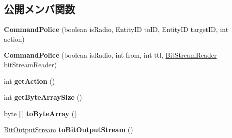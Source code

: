 \subsection*{公開メンバ関数}
\begin{DoxyCompactItemize}
\item 
\hypertarget{classadf_1_1agent_1_1communication_1_1standard_1_1bundle_1_1centralized_1_1CommandPolice_ac747822b23d13b000beb3b87899123a1}{}\label{classadf_1_1agent_1_1communication_1_1standard_1_1bundle_1_1centralized_1_1CommandPolice_ac747822b23d13b000beb3b87899123a1} 
{\bfseries Command\+Police} (boolean is\+Radio, Entity\+ID to\+ID, Entity\+ID target\+ID, int action)
\item 
\hypertarget{classadf_1_1agent_1_1communication_1_1standard_1_1bundle_1_1centralized_1_1CommandPolice_ae700d27dad6fa5ee05fa26f99b61e26e}{}\label{classadf_1_1agent_1_1communication_1_1standard_1_1bundle_1_1centralized_1_1CommandPolice_ae700d27dad6fa5ee05fa26f99b61e26e} 
{\bfseries Command\+Police} (boolean is\+Radio, int from, int ttl, \hyperlink{classadf_1_1component_1_1communication_1_1util_1_1BitStreamReader}{Bit\+Stream\+Reader} bit\+Stream\+Reader)
\item 
\hypertarget{classadf_1_1agent_1_1communication_1_1standard_1_1bundle_1_1centralized_1_1CommandPolice_a0460d50153618a65c5a39253c7947ec3}{}\label{classadf_1_1agent_1_1communication_1_1standard_1_1bundle_1_1centralized_1_1CommandPolice_a0460d50153618a65c5a39253c7947ec3} 
int {\bfseries get\+Action} ()
\item 
\hypertarget{classadf_1_1agent_1_1communication_1_1standard_1_1bundle_1_1centralized_1_1CommandPolice_aaa4419097722ca8e6296e9c943bb9bdc}{}\label{classadf_1_1agent_1_1communication_1_1standard_1_1bundle_1_1centralized_1_1CommandPolice_aaa4419097722ca8e6296e9c943bb9bdc} 
int {\bfseries get\+Byte\+Array\+Size} ()
\item 
\hypertarget{classadf_1_1agent_1_1communication_1_1standard_1_1bundle_1_1centralized_1_1CommandPolice_ae3b054102b803bfc346cc0eb3c2a5e67}{}\label{classadf_1_1agent_1_1communication_1_1standard_1_1bundle_1_1centralized_1_1CommandPolice_ae3b054102b803bfc346cc0eb3c2a5e67} 
byte \mbox{[}$\,$\mbox{]} {\bfseries to\+Byte\+Array} ()
\item 
\hypertarget{classadf_1_1agent_1_1communication_1_1standard_1_1bundle_1_1centralized_1_1CommandPolice_a989a2862919a4f61ece93dd21668b1fd}{}\label{classadf_1_1agent_1_1communication_1_1standard_1_1bundle_1_1centralized_1_1CommandPolice_a989a2862919a4f61ece93dd21668b1fd} 
\hyperlink{classadf_1_1component_1_1communication_1_1util_1_1BitOutputStream}{Bit\+Output\+Stream} {\bfseries to\+Bit\+Output\+Stream} ()

\end{DoxyCompactItemize}

